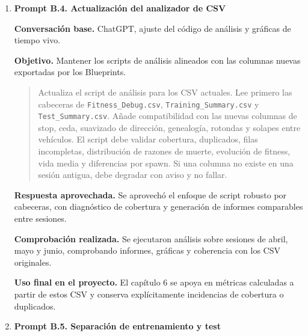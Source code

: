 {\begin{enumerate}[leftmargin=*,itemsep=0.2\baselineskip,topsep=2pt,parsep=0pt,partopsep=0pt]
  \textbf{Respuesta aprovechada.} Se aprovechó el análisis de interacción entre penalización acumulada, velocidad casi nula, contexto \texttt{ForceStop} y reinicio de contadores.

  \textbf{Comprobación realizada.} Se contrastó con registros de navegación fuera de calzada, finalizaciones por tiempo, penalizaciones acumuladas y ausencia de muertes \texttt{NAV\_VIOLATION} en determinadas sesiones.

  \textbf{Uso final en el proyecto.} La memoria incorpora la salida de calzada como problema de acumulación temporal y de penalización, y no como simple colisión geométrica.

  \item \textbf{Prompt B.4. Actualización del analizador de CSV}

  \textbf{Conversación base.} ChatGPT, ajuste del código de análisis y gráficas de tiempo vivo.

  \textbf{Objetivo.} Mantener los scripts de análisis alineados con las columnas nuevas exportadas por los Blueprints.

  \promptDepurado
  \begin{quote}
  \small
  Actualiza el script de análisis para los CSV actuales. Lee primero las cabeceras de \texttt{Fitness\_Debug.csv}, \texttt{Training\_Summary.csv} y \texttt{Test\_Summary.csv}. Añade compatibilidad con las nuevas columnas de stop, ceda, suavizado de dirección, genealogía, rotondas y solapes entre vehículos. El script debe validar cobertura, duplicados, filas incompletas, distribución de razones de muerte, evolución de fitness, vida media y diferencias por spawn. Si una columna no existe en una sesión antigua, debe degradar con aviso y no fallar.
  \end{quote}

  \textbf{Respuesta aprovechada.} Se aprovechó el enfoque de script robusto por cabeceras, con diagnóstico de cobertura y generación de informes comparables entre sesiones.

  \textbf{Comprobación realizada.} Se ejecutaron análisis sobre sesiones de abril, mayo y junio, comprobando informes, gráficas y coherencia con los CSV originales.

  \textbf{Uso final en el proyecto.} El capítulo 6 se apoya en métricas calculadas a partir de estos CSV y conserva explícitamente incidencias de cobertura o duplicados.

  \item \textbf{Prompt B.5. Separación de entrenamiento y test}


\end{enumerate}}
